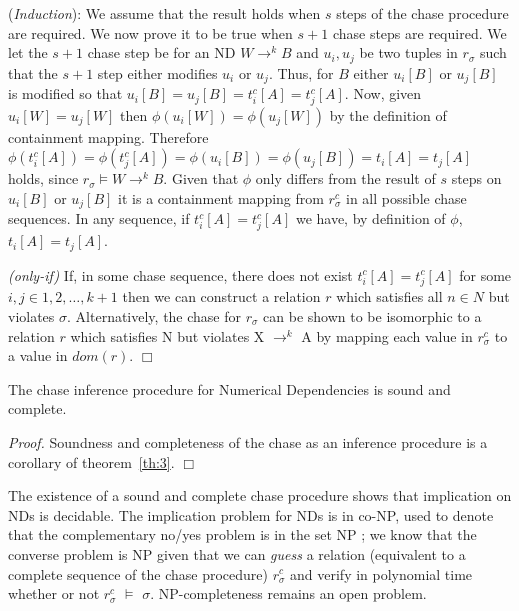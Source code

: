 ({\em Induction}):
We assume that the result holds when $s$ steps of the chase procedure
are required. We now prove it to be true when $s+1$ chase steps are
required. We let the $s+1$ chase step be for an ND $W \to^k B$ and
$u_i, u_j$ be two tuples in $r_\sigma$ such that the $s+1$ step either modifies
$u_i$ or $u_j$. Thus, for $B$ either $u_i[B]$ or 
$u_j[B]$ is modified so that $u_i[B] = u_j[B] = t_i^c[A] = t_j^c[A]$.
Now, given $u_i[W] = u_j[W]$ then $\phi(u_i[W]) = \phi(u_j[W])$ by the
definition of containment mapping.  Therefore $\phi(t_i^c[A]) =
\phi(t_j^c[A]) = \phi(u_i[B]) = \phi(u_j[B]) = t_i[A] = t_j[A]$ holds, since $r_{\sigma}
\models W \to^k B$. Given that $\phi$ only differs from the result of
$s$ steps on $u_i[B]$ or $u_j[B]$ it is a containment mapping from
$r_\sigma^c$ in all possible chase sequences. In any sequence, if
$t_i^c[A] = t_j^c[A]$ we have, by definition of $\phi$, $t_i[A] = t_j[A]$.

\smallskip

{ \em (only-if)} If, in some chase sequence, there does not exist
$t_i^c[A] = t_j^c[A]$ for 
some $i,j \in {1,2, \ldots, k+1}$ then we can
construct a relation $r$ 
which satisfies all $n \in N$ but violates $\sigma$.  
\smallskip
Alternatively, the chase for $r_\sigma$ can be shown to be isomorphic
to a relation $r$ which satisfies N but violates X $\to^k$ A by
mapping each value in $r_{\sigma}^c$ to a value in $dom(r)$. $\Box$



\begin{corollary}\label{th:3}
\begin{rm}
The chase inference procedure for Numerical Dependencies is sound and
complete.
\end{rm}
\end{corollary}

{\em Proof.} Soundness and completeness of the chase as an inference
procedure is a corollary of theorem~\ref{th:3}. $\Box$

\smallskip
The existence of a sound and complete chase procedure shows that
implication on NDs is decidable. The implication
problem for NDs is in co-NP, used to denote that the complementary
no/yes problem is in the 
set NP \cite{gj79}; we know that the converse
problem is NP given that we can {\em guess} a relation  (equivalent to
a complete sequence of the chase procedure) 
$r_\sigma^c$ 
and verify in polynomial time whether or not
$r_\sigma^c$ $\models$ $\sigma$. NP-completeness remains an open problem.


